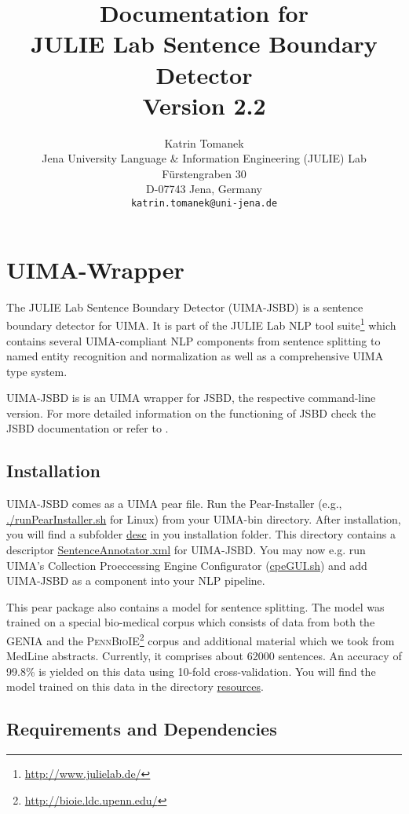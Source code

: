 \documentclass[11pt,a4paper,halfparskip]{scrartcl}
\title{\small{Documentation for}\\\huge JULIE Lab Sentence Boundary Detector\\\vspace{3mm}\small{Version 2.2}}
\author{\normalsize Katrin Tomanek\\
  \normalsize  Jena University Language \& Information Engineering (JULIE) Lab\\
  \normalsize F\"urstengraben 30 \\
  \normalsize D-07743 Jena, Germany\\
  {\normalsize \tt katrin.tomanek@uni-jena.de} }
\date{}
\begin{document}
\maketitle
\tableofcontents

\section{UIMA-Wrapper}



The JULIE Lab Sentence Boundary Detector (UIMA-JSBD) is a sentence
boundary detector for UIMA.  It is part of the JULIE Lab NLP tool
suite\footnote{\url{http://www.julielab.de/}} which contains several
UIMA-compliant NLP components from sentence splitting to named entity
recognition and normalization as well as a comprehensive UIMA type
system.

UIMA-JSBD is is an UIMA wrapper for JSBD, the respective command-line
version. For more detailed information on the functioning of JSBD
check the JSBD documentation or refer to \cite{Tomanek2007a}.

\subsection{Installation}

UIMA-JSBD comes as a UIMA pear file. Run the Pear-Installer (e.g.,
\url{./runPearInstaller.sh} for Linux) from your UIMA-bin directory.
After installation, you will find a subfolder \url{desc} in you
installation folder. This directory contains a descriptor
\url{SentenceAnnotator.xml} for UIMA-JSBD. You may now e.g. run UIMA's
Collection Proeccessing Engine Configurator (\url{cpeGUI.sh}) and add
UIMA-JSBD as a component into your NLP pipeline.

This pear package also contains a model for sentence splitting. The
model was trained on a special bio-medical corpus which consists of
data from both the GENIA \cite{Ohta2002} and the
\textsc{PennBioIE}\footnote{\url{http://bioie.ldc.upenn.edu/}} corpus
and additional material which we took from MedLine abstracts.
Currently, it comprises about 62000 sentences. An accuracy of 99.8\%
is yielded on this data using 10-fold cross-validation.  You will find
the model trained on this data in the directory \url{resources}.


\subsection{Requirements and Dependencies}
\end{document}
